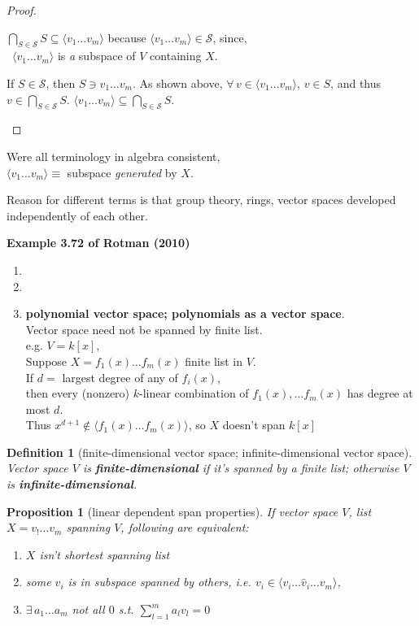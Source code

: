 \documentclass[10pt]{amsart}
\newtheorem{proposition}{Proposition}
\newtheorem{definition}{Definition}
\begin{document}
\begin{multicols*}{2}
\begin{proof}
\begin{enumerate}
$\bigcap_{S \in \mathcal{S}} S \subseteq \langle v_1 \dots v_m \rangle$ because $\langle v_1 \dots v_m \rangle \in \mathcal{S}$, since, \\
\qquad \, $\langle v_1 \dots v_m \rangle$ is \emph{a} subspace of $V$ containing $X$. 

If $S\in \mathcal{S}$, then $S\ni v_1 \dots v_m$.  As shown above, $\forall \, v\in \langle v_1 \dots v_m \rangle$, $v\in S$, and thus $v\in \bigcap_{S\in \mathcal{S}} S$. $\langle v_1 \dots v_m \rangle \subseteq \bigcap_{S\in \mathcal{S}} S$.  
\end{enumerate}
	\end{proof}

Were all terminology in algebra consistent, \\
$\langle v_1 \dots v_m \rangle \equiv $ subspace \emph{generated} by $X$.  

Reason for different terms is that group theory, rings, vector spaces developed independently of each other.

\textbf{Example 3.72 of Rotman (2010) \cite{JRotman2010}}
\begin{enumerate}
	\item[(i)]
	\item[(ii)]
	\item[(iii)] \textbf{polynomial vector space; polynomials as a vector space}.  \\
	Vector space need not be spanned by finite list. \\
	e.g. $V=k[x]$, \\
	Suppose $X= f_1(x) \dots f_m(x)$ finite list in $V$. \\
	If $d= $ largest degree of any of $f_i(x)$, \\
	then every (nonzero) $k$-linear combination of $f_1(x), \dots f_m(x)$ has degree at most $d$. \\
	Thus $x^{d+1} \notin \langle f_1(x) \dots f_m(x) \rangle$, so $X$ doesn't span $k[x]$
\end{enumerate}

\begin{definition}[finite-dimensional vector space; infinite-dimensional vector space]
	Vector space $V$ is \textbf{finite-dimensional} if it's spanned by a finite list; otherwise $V$ is \textbf{infinite-dimensional}.
\end{definition}

\begin{proposition}[linear dependent span properties]
If vector space $V$, list $X=v_! \dots v_m$ spanning $V$, following are equivalent:
	\begin{enumerate}
		\item[(i)] $X$ isn't shortest spanning list 
		\item[(ii)] some $v_i$ is in subspace spanned by others, i.e. $v_i \in \langle v_i \dots \widehat{v}_i \dots v_m \rangle$, 
		\item[(iii)]		$\exists \, a_1 \dots a_m$ not all $0$ s.t. $\sum_{l=1}^m a_l v_l = 0$
	\end{enumerate}
\end{proposition}


\end{multicols*}
\end{document}
